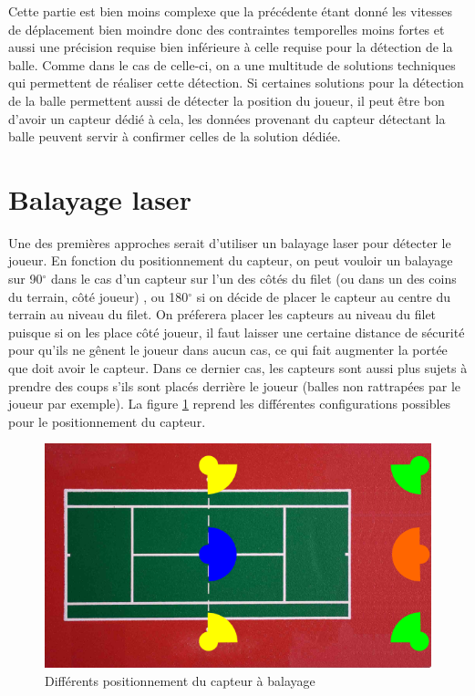 Cette partie est bien moins complexe que la précédente étant donné les vitesses de déplacement bien moindre donc des contraintes temporelles moins fortes et aussi une précision requise bien inférieure à celle requise pour la détection de la balle. Comme dans le cas de celle-ci, on a une multitude de solutions techniques qui permettent de réaliser cette détection. Si certaines solutions pour la détection de la balle permettent aussi de détecter la position du joueur, il peut être bon d'avoir un capteur dédié à cela, les données provenant du capteur détectant la balle peuvent servir à confirmer celles de la solution dédiée.


\section{Balayage laser}

Une des premières approches serait d'utiliser un balayage laser pour détecter le joueur. En fonction du positionnement du capteur, on peut vouloir un balayage sur 90$^\circ$ dans le cas d'un capteur sur l'un des côtés du filet (ou dans un des coins du terrain, côté joueur) , ou 180$^\circ$ si on décide de placer le capteur au centre du terrain au niveau du filet. On préferera placer les capteurs au niveau du filet puisque si on les place côté joueur, il faut laisser une certaine distance de sécurité pour qu'ils ne gênent le joueur dans aucun cas, ce qui fait augmenter la portée que doit avoir le capteur. Dans ce dernier cas, les capteurs sont aussi plus sujets à prendre des coups s'ils sont placés derrière le joueur (balles non rattrapées par le joueur par exemple). La figure \ref{img_joueurpositionlaser} reprend les différentes configurations possibles pour le positionnement du capteur. 

\begin{figure}[h]
\begin{center}
\includegraphics[width=\textwidth]{joueurpositionlaser.png}
\caption{Différents positionnement du capteur à balayage}
\label{img_joueurpositionlaser}
\end{center}
\end{figure}


